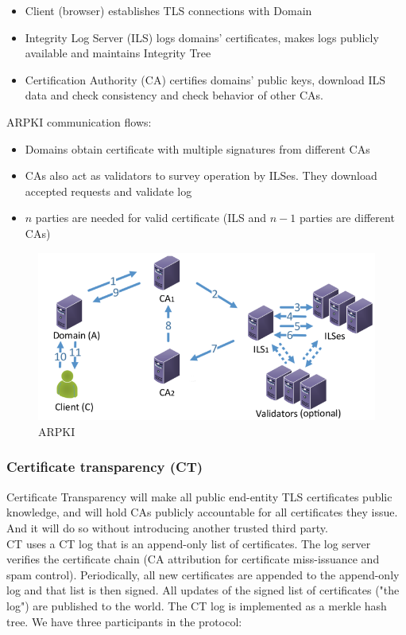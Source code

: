 \documentclass[11pt,oneside,a4paper]{article}
\begin{document}
\vspace{-\topsep}
\begin{itemize}
	\setlength{\itemsep}{0pt}
	\setlength{\parskip}{0pt}
	\item Client (browser) establishes TLS connections with	Domain
	\item Integrity Log Server (ILS) logs domains’ certificates, makes logs publicly available and maintains Integrity Tree
	\item Certification Authority (CA) certifies domains’ public keys, download ILS data and check consistency and check behavior of other CAs.
\end{itemize}
\vspace{-\topsep}

ARPKI communication flows:

\vspace{-\topsep}
\begin{itemize}
	\setlength{\itemsep}{0pt}
	\setlength{\parskip}{0pt}
	\item Domains obtain certificate with multiple signatures from different CAs
	\item CAs also act as validators to survey operation by ILSes. They download accepted requests and validate log
	\item $n$ parties are needed for valid certificate (ILS and $n-1$ parties are different CAs)
\end{itemize}
\vspace{-\topsep}

\begin{figure}[t!]
	\centering
	\includegraphics[width=0.5\linewidth]{figures/arpki}
	\caption{ARPKI}
	\label{fig:arpki}
\end{figure}

\newpage

\subsubsection{Certificate transparency (CT)}

Certificate	Transparency will make all public end-entity TLS certificates public knowledge,	and	will hold CAs publicly accountable for all certificates they issue. And it will do so without introducing another trusted third party.\\
CT uses a CT log that is an append-only list of certificates. The log server verifies the certificate chain (CA attribution for certificate miss-issuance and spam control). Periodically, all new certificates are appended to the append-only log and that list is then signed. All updates of the signed list of certificates ("the log") are published to the world. The CT log is implemented as a merkle hash tree. We have three participants in the protocol:
\end{document}
